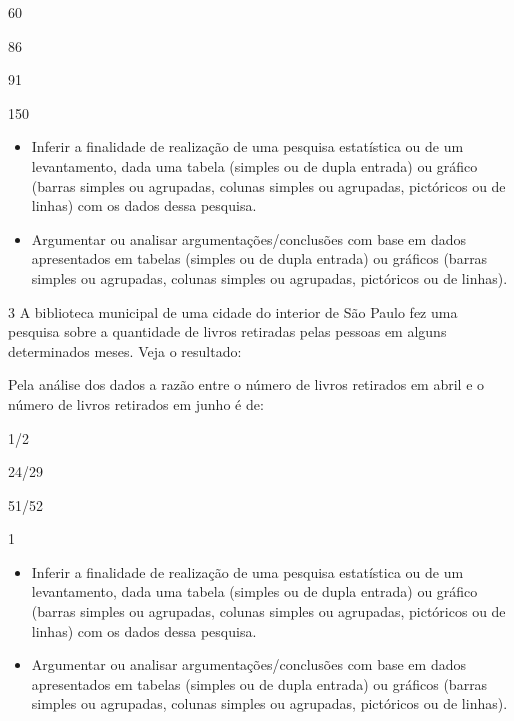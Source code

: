 \begin{escolha}
\item
  60
\item
  86
\item
  91
\item
  150
\end{escolha}



\begin{itemize}
\item Inferir a finalidade de realização de uma pesquisa estatística ou de
um levantamento, dada uma tabela (simples ou de dupla entrada) ou
gráfico (barras simples ou agrupadas, colunas simples ou agrupadas,
pictóricos ou de linhas) com os dados dessa pesquisa.

\item Argumentar ou analisar argumentações/conclusões com base em dados
apresentados em tabelas (simples ou de dupla entrada) ou gráficos
(barras simples ou agrupadas, colunas simples ou agrupadas, pictóricos
ou de linhas).
\end{itemize}


\num{3} A biblioteca municipal de uma cidade do interior de São Paulo fez
uma pesquisa sobre a quantidade de livros retiradas pelas pessoas em
alguns determinados meses. Veja o resultado:


Pela análise dos dados a razão entre o número de livros retirados em
abril e o número de livros retirados em junho é de:

\begin{escolha}
\item
  1/2
\item
  24/29
\item
  51/52
\item
  1
\end{escolha}



\begin{itemize}
\item Inferir a finalidade de realização de uma pesquisa estatística ou de
um levantamento, dada uma tabela (simples ou de dupla entrada) ou
gráfico (barras simples ou agrupadas, colunas simples ou agrupadas,
pictóricos ou de linhas) com os dados dessa pesquisa.

\item Argumentar ou analisar argumentações/conclusões com base em dados
apresentados em tabelas (simples ou de dupla entrada) ou gráficos
(barras simples ou agrupadas, colunas simples ou agrupadas, pictóricos
ou de linhas).
\end{itemize}

